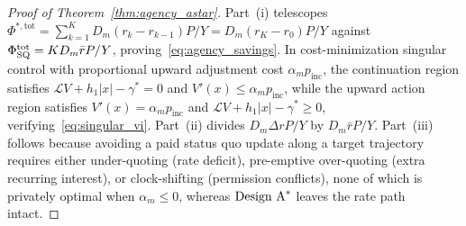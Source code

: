 \begin{proof}[Proof of Theorem~\ref{thm:agency_astar}]
Part~(i) telescopes $\Phi^{*,\mathrm{tot}} = \sum_{k=1}^K D_m(r_k - r_{k-1})P/Y = D_m(r_K - r_0)P/Y$ against $\Phi_{\mathrm{SQ}}^{\mathrm{tot}} = K D_m \bar{r}P/Y$, proving~\eqref{eq:agency_savings}. In cost-minimization singular control with proportional upward adjustment cost $\alpha_m p_{\mathrm{inc}}$, the continuation region satisfies $\mathcal{L}V + h_1|x| - \gamma^* = 0$ and $V'(x) \le \alpha_m p_{\mathrm{inc}}$, while the upward action region satisfies $V'(x) = \alpha_m p_{\mathrm{inc}}$ and $\mathcal{L}V + h_1|x| - \gamma^* \ge 0$, verifying~\eqref{eq:singular_vi}. Part~(ii) divides $D_m \Delta r P/Y$ by $D_m \bar{r}P/Y$. Part~(iii) follows because avoiding a paid status quo update along a target trajectory requires either under-quoting (rate deficit), pre-emptive over-quoting (extra recurring interest), or clock-shifting (permission conflicts), none of which is privately optimal when $\alpha_m \le 0$, whereas $\textup{Design A}^*$ leaves the rate path intact.
\end{proof}


